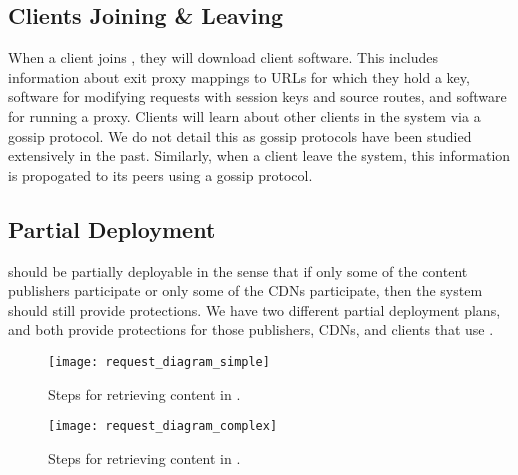 \subsection{Clients Joining \& Leaving}
\label{sec:join}

When a client joins \system{}, they will download \system{} client software.  This includes information about exit proxy mappings to URLs for which they hold a key, 
software for modifying requests with session keys and source routes, and software for running a proxy.  Clients will learn about other clients in the system via 
a gossip protocol.  We do not detail this as gossip protocols have been studied extensively in the past.  Similarly, when a client leave the system, this 
information is propogated to its peers using a gossip protocol.

\subsection{Partial Deployment}
\label{sec:partial}
\system{} should be partially deployable in the sense that if only some of the content publishers participate or only some of the CDNs participate, then 
the system should still provide protections.  We have two different partial deployment plans, and both provide protections for those 
publishers, CDNs, and clients that use \system{}. 

\begin{figure}[t!]
\centering
\texttt{[image: request\_diagram\_simple]}
\caption{Steps for retrieving content in \system{}.}
\label{fig:retrieving}
\end{figure}

\begin{figure}[t!]
\centering
\texttt{[image: request\_diagram\_complex]}
\caption{Steps for retrieving content in \system{}.}
\label{fig:retrieving2}
\end{figure}

